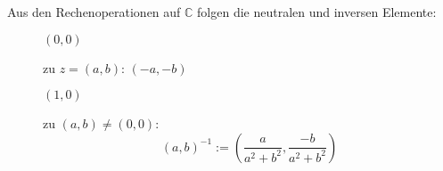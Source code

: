 Aus den Rechenoperationen auf $\mathbb{C}$ folgen die neutralen und inversen Elemente:
\begin{description}
    \item[] $(0, 0)$
    \item[] zu $z = (a, b)$: $(-a, -b)$
    \item[] $(1, 0)$
    \item[] zu $(a, b) \neq (0, 0)$:
    $$(a, b)^{-1} := \left(\frac{a}{a^2+b^2}, \frac{-b}{a^2+b^2}\right)$$
\end{description}